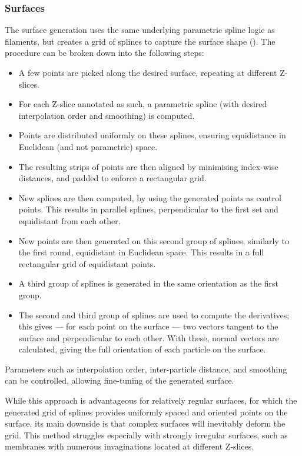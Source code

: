\subsubsection{Surfaces}
The surface generation uses the same underlying parametric spline logic as filaments, but creates a grid of splines to capture the surface shape (). The procedure can be broken down into the following steps:

\begin{itemize}[noitemsep] 
    \item A few points are picked along the desired surface, repeating at different Z-slices.
    \item For each Z-slice annotated as such, a parametric spline (with desired interpolation order and smoothing) is computed.
    \item Points are distributed uniformly on these splines, ensuring equidistance in Euclidean (and not parametric) space.
    \item The resulting strips of points are then aligned by minimising index-wise distances, and padded to enforce a rectangular grid.
    \item New splines are then computed, by using the generated points as control points. This results in parallel splines, perpendicular to the first set and equidistant from each other.
    \item New points are then generated on this second group of splines, similarly to the first round, equidistant in Euclidean space. This results in a full rectangular grid of equidistant points.
    \item A third group of splines is generated in the same orientation as the first group.
    \item The second and third group of splines are used to compute the derivatives; this gives --- for each point on the surface --- two vectors tangent to the surface and perpendicular to each other. With these, normal vectors are calculated, giving the full orientation of each particle on the surface.
\end{itemize}

Parameters such as interpolation order, inter-particle distance, and smoothing can be controlled, allowing fine-tuning of the generated surface.

While this approach is advantageous for relatively regular surfaces, for which the generated grid of splines provides uniformly spaced and oriented points on the surface, its main downside is that complex surfaces will inevitably deform the grid. This method struggles especially with strongly irregular surfaces, such as membranes with numerous invaginations located at different Z-slices.

